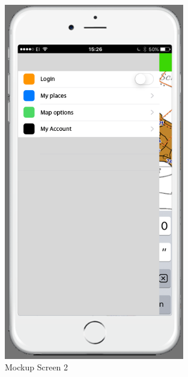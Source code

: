\begin{figure}[H]
\centering
    \includegraphics[width=0.7\textwidth]{mockup1-2}
    \caption{Mockup Screen 2}
    \label{fig:mesh2}
\end{figure}

